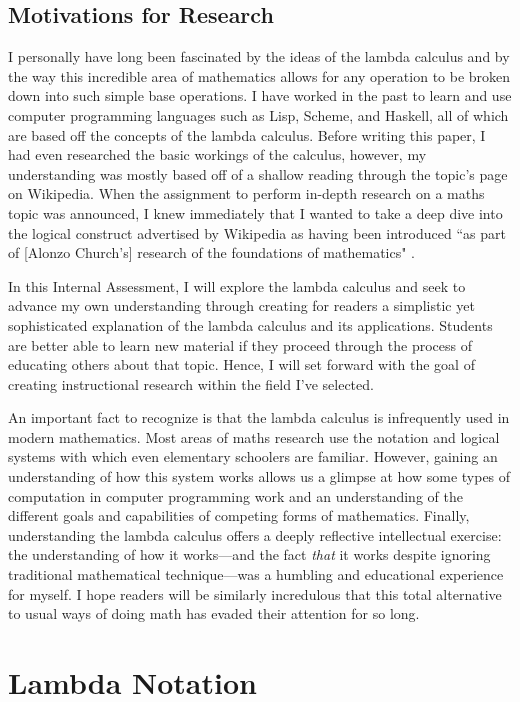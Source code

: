 \documentclass[twocolumn,titlepage,12pt]{article}
\begin{document}
\subsection{Motivations for Research}
I personally have long been fascinated by the ideas of the lambda calculus and by the way this incredible area of mathematics allows for any operation to be broken down into such simple base operations. I have worked in the past to learn and use computer programming languages such as Lisp, Scheme, and Haskell, all of which are based off the concepts of the lambda calculus. Before writing this paper, I had even researched the basic workings of the calculus, however, my understanding was mostly based off of a shallow reading through the topic's page on Wikipedia. When the assignment to perform in-depth research on a maths topic was announced, I knew immediately that I wanted to take a deep dive into the logical construct advertised by Wikipedia as having been introduced ``as part of [Alonzo Church's] research of the foundations of mathematics" \cite{wikipedialc}.

In this Internal Assessment, I will explore the lambda calculus and seek to advance my own understanding through creating for readers a simplistic yet sophisticated explanation of the lambda calculus and its applications. Students are better able to learn new material if they proceed through the process of educating others about that topic. Hence, I will set forward with the goal of creating instructional research within the field I've selected.

An important fact to recognize is that the lambda calculus is infrequently used in modern mathematics. Most areas of maths research use the notation and logical systems with which even elementary schoolers are familiar. However, gaining an understanding of how this system works allows us a glimpse at how some types of computation in computer programming work and an understanding of the different goals and capabilities of competing forms of mathematics. Finally, understanding the lambda calculus offers a deeply reflective intellectual exercise: the understanding of how it works---and the fact \textit{that} it works despite ignoring traditional mathematical technique---was a humbling and educational experience for myself. I hope readers will be similarly incredulous that this total alternative to usual ways of doing math has evaded their attention for so long.

\section{Lambda Notation}
\end{document}
